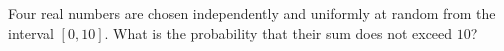 Four real numbers are chosen independently and uniformly at random from the interval $[0,10]$. What is the probability that their sum does not exceed $10$?
